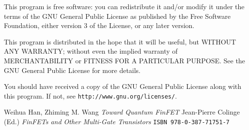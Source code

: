 \documentclass[a4paper]{article}
\begin{document}
\begin{appendices}
  This program is free software: you can redistribute it and/or modify it under the terms of the GNU General Public License as published by the Free Software Foundation, either version 3 of the License, or any later version.

  This program is distributed in the hope that it will be useful, but WITHOUT ANY WARRANTY; without even the implied warranty of MERCHANTABILITY or FITNESS FOR A PARTICULAR PURPOSE. See the GNU General Public License for more details.

  You should have received a copy of the GNU General Public License along with this program.  If not, see \texttt{http://www.gnu.org/licenses/}.

\end{appendices}

\begin{thebibliography}{10}
  Weihua Han, Zhiming M. Wang \emph{Toward Quantum FinFET}
  Jean-Pierre Colinge (Ed.) \emph{FinFETs and Other Multi-Gate Transistors} \texttt{ISBN 978-0-387-71751-7}
\end{thebibliography}
\end{document}
